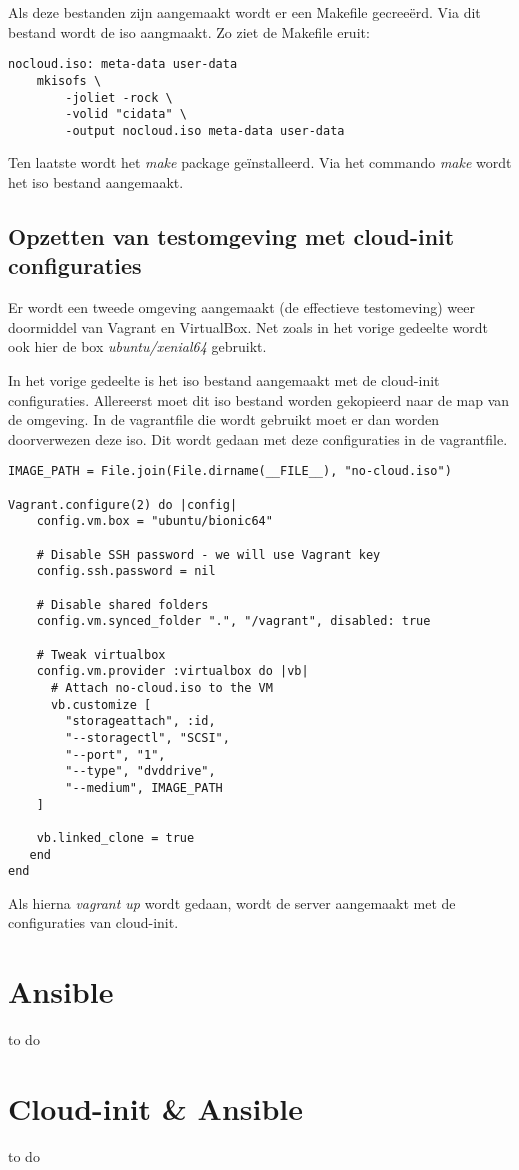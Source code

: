 Als deze bestanden zijn aangemaakt wordt er een Makefile gecreeërd. Via dit bestand wordt de iso aangmaakt. Zo ziet de Makefile eruit:
\begin{lstlisting}
nocloud.iso: meta-data user-data
    mkisofs \
        -joliet -rock \
        -volid "cidata" \
        -output nocloud.iso meta-data user-data
\end{lstlisting}

Ten laatste wordt het \textit{make} package geïnstalleerd. Via het commando \textit{make} wordt het iso bestand aangemaakt.

\subsection{Opzetten van testomgeving met cloud-init configuraties}
Er wordt een tweede omgeving aangemaakt (de effectieve testomeving) weer doormiddel van Vagrant en VirtualBox. Net zoals in het vorige gedeelte wordt ook hier de box \textit{ubuntu/xenial64} gebruikt.

In het vorige gedeelte is het iso bestand aangemaakt met de cloud-init configuraties. Allereerst moet dit iso bestand worden gekopieerd naar de map van de omgeving. In de vagrantfile die wordt gebruikt moet er dan worden doorverwezen deze iso. Dit wordt gedaan met deze configuraties in de vagrantfile.
\begin{lstlisting}
IMAGE_PATH = File.join(File.dirname(__FILE__), "no-cloud.iso")

Vagrant.configure(2) do |config|
	config.vm.box = "ubuntu/bionic64"
	
	# Disable SSH password - we will use Vagrant key
	config.ssh.password = nil
	
	# Disable shared folders
	config.vm.synced_folder ".", "/vagrant", disabled: true
	
	# Tweak virtualbox
	config.vm.provider :virtualbox do |vb|
	  # Attach no-cloud.iso to the VM
	  vb.customize [
	    "storageattach", :id,
	    "--storagectl", "SCSI",
	    "--port", "1",
	    "--type", "dvddrive",
	    "--medium", IMAGE_PATH
	]
	
	vb.linked_clone = true
   end
end
\end{lstlisting}
Als hierna \textit{vagrant up} wordt gedaan, wordt de server aangemaakt met de configuraties van cloud-init.
 
\section{Ansible}
to do

\section{Cloud-init \& Ansible }
to do